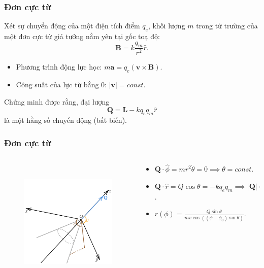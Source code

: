 \begin{frame}
    \frametitle{Đơn cực từ}
    Xét sự chuyển động của một điện tích điểm \(q_e\), khối lượng \(m\) trong từ trường của một đơn cực từ giả tưởng nằm yên tại gốc toạ độ:
    \[\mathbf{B}=k\frac{q_m}{r^2}\hat{r}.\]
    \begin{itemize}
        \item Phương trình động lực học: \(m\mathbf{a}=q_e(\mathbf{v}\times\mathbf{B})\).
        \item Công suất của lực từ bằng 0: \(\lvert\mathbf{v}\rvert=const\).
    \end{itemize}
    Chứng minh được rằng, đại lượng \[\mathbf{Q}=\mathbf{L}-kq_e q_m \hat{r}\] là một hằng số chuyển động (bất biến).
\end{frame}
\begin{frame}
    \frametitle{Đơn cực từ}
    \begin{columns}
        \begin{column}{0.5\textwidth}
            \vspace{-16pt}

            \begin{figure}
        \centering
        \includegraphics[width=6cm, height=6cm]{Content/Figure/magnetic_monopole.png}
    \end{figure}
        \end{column}
        \begin{column}{0.5\textwidth}
            \begin{itemize}
                \item \(\mathbf{Q}\cdot\hat{\phi}=mr^2\dot\theta=0\implies \theta=const\).
                \item \(\mathbf{Q}\cdot\hat{r}=Q\cos\theta=-kq_e q_m \implies \lvert \mathbf{Q}\rvert =const\).
                \item \(r(\phi)=\frac{Q\sin\theta}{mv\cos((\phi-\phi_0)\sin\theta)}\).
            \end{itemize}
            
        \end{column}
    \end{columns}
\end{frame}